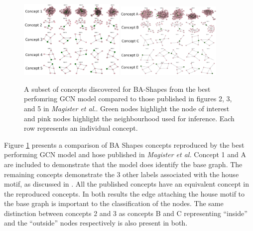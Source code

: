 \begin{figure}
    \centering
    \includegraphics[width=0.45\textwidth]{figures/GCN-BA-Shapes}
    \includegraphics[width=0.45\textwidth]{figures/Magister-BA-Shapes}
    \caption{A subset of concepts discovered for BA-Shapes from the best perfomring GCN model compared to those published in figures 2, 3, and 5 in \textit{Magister et al.}\cite{magister2021gcexplainer}. Green nodes highlight the node of interest and pink nodes highlight the neighbourhood used for inference. Each row represents an individual concept.}
    \label{fig:GCN-BA-Shapes}
\end{figure}

%

Figure \ref{fig:GCN-BA-Shapes} presents a comparison of BA Shapes concepts reproduced by the best performing GCN model and hose published in \textit{Magister et al.}
Concept 1 and A are included to demonstrate that the model does identify the base graph.
The remaining concepts demonstrate the 3 other labels associated with the house motif, as discussed in .
All the published concepts have an equivalent concept in the reproduced concepts.
In both results the edge attaching the house motif to the base graph is important to the classification of the nodes.
The same distinction between concepts 2 and 3 as concepts B and C representing ``inside'' and the ``outside'' nodes respectively is also present in both.

